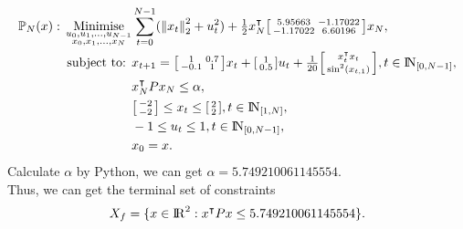 \documentclass[a4paper,11pt,reqno]{amsart}
\newcommand{\R}{{\rm I\!R}}
\newcommand{\N}{{\rm I\!N}}
\newcommand{\tran}{\intercal}
\begin{document}
\begin{subequations}
    \begin{align}
        \mathbb{P}_N(x){}:{}
        \operatorname*{Minimise}_{\substack{u_0,u_1,\ldots,u_{N-1}\\ x_0,x_1,\ldots,x_N}}&\sum_{t=0}^{N-1} (\left\lVert x_t\right\rVert ^2_2+u_t^2) + \tfrac{1}{2}x_N^{\tran}\begin{bsmallmatrix}5.95663&-1.17022\\-1.17022&6.60196\end{bsmallmatrix}x_N,
        \\
        \text{subject to: }& x_{t+1} = 
        \begin{bsmallmatrix}
            1&0.7\\
            -0.1&1
        \end{bsmallmatrix}x_t + 
        \begin{bsmallmatrix}
            1\\
            0.5
        \end{bsmallmatrix}u_t+
        \tfrac{1}{20}
        \begin{bsmallmatrix}
            x_t^{\tran}x_t\\
            \sin^2(x_{t,1})
        \end{bsmallmatrix}, t\in\N_{[0,N-1]},
        \\
        &x_N^{\tran} P x_N \leq \alpha,
        \\
        &\begin{bsmallmatrix}
            -2\\
            -2
        \end{bsmallmatrix} 
        \leq x_t \leq 
        \begin{bsmallmatrix}
            2\\
            2
        \end{bsmallmatrix}, t\in\N_{[1,N]},
        \\
        &-1 \leq u_t \leq 1, t\in\N_{[0,N-1]},
        \\
        & x_0 = x.
    \end{align}
\end{subequations}
Calculate $\alpha$ by Python, we can get $\alpha=5.749210061145554$.
\\
Thus, we can get the terminal set of constraints
\begin{equation}
    X_f=\{x\in\R^2:x^{\tran}Px\leq 5.749210061145554\}.
\end{equation}



\end{document}
